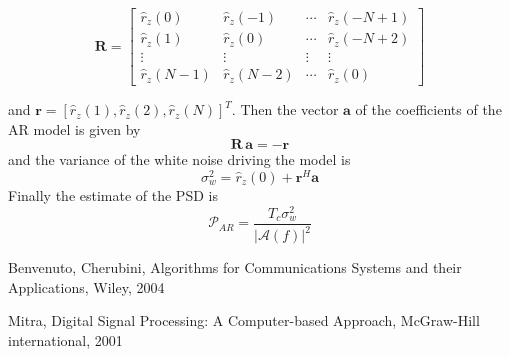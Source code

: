 \documentclass[10pt]{article}
\begin{document}
\begin{equation}
  \mathbf{R} =
  \begin{bmatrix}
    \hat{r}_z(0) & \hat{r}_z(-1) & \cdots & \hat{r}_z(-N+1) \\
    \hat{r}_z(1) & \hat{r}_z(0)  & \cdots & \hat{r}_z(-N+2) \\
    \vdots       & \vdots        & \vdots & \vdots \\
    \hat{r}_z(N-1) & \hat{r}_z(N-2) & \cdots & \hat{r}_z(0)
  \end{bmatrix}
\end{equation}

and $ \mathbf{r} = [\hat{r}_z(1), \hat{r}_z(2), \hat{r}_z(N)]^T $. Then the vector $\mathbf{a}$ of the coefficients of the AR model is given by
\begin{equation}
  \mathbf{R} \, \mathbf{a} = - \mathbf{r}
\end{equation}
and the variance of the white noise driving the model is
\begin{equation}
  \sigma_w^2 = \hat{r}_z(0) + \mathbf{r}^H\mathbf{a}
\end{equation}
Finally the estimate of the PSD is
\begin{equation}
  \mathcal{P}_{AR} = \frac{T_c \sigma_w^2}{|\mathcal{A}(f)|^2}
\end{equation}


\begin{thebibliography}{10}

Benvenuto, Cherubini, Algorithms for Communications Systems and their Applications, Wiley, 2004

Mitra, Digital Signal Processing: A Computer-based Approach, McGraw-Hill international, 2001

\end{thebibliography}
\end{document}
